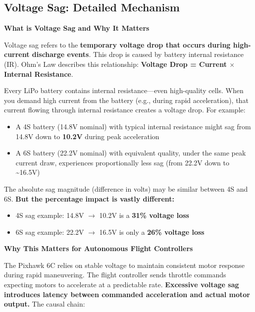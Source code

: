 \subsection{Voltage Sag: Detailed Mechanism}

\textbf{What is Voltage Sag and Why It Matters}

Voltage sag refers to the \textbf{temporary voltage drop that occurs during high-current discharge events}. This drop is caused by battery internal resistance (IR). Ohm's Law describes this relationship: \textbf{Voltage Drop = Current \(\times\) Internal Resistance}.\cite{bershadsky2016propulsion}

Every LiPo battery contains internal resistance---even high-quality cells. When you demand high current from the battery (e.g., during rapid acceleration), that current flowing through internal resistance creates a voltage drop.\cite{bershadsky2016propulsion} For example:

\begin{itemize}
    \item A 4S battery (14.8V nominal) with typical internal resistance might sag from 14.8V down to \textbf{10.2V} during peak acceleration
    \item A 6S battery (22.2V nominal) with equivalent quality, under the same peak current draw, experiences proportionally less sag (from 22.2V down to \textasciitilde16.5V)\cite{bershadsky2016propulsion}
\end{itemize}

The absolute sag magnitude (difference in volts) may be similar between 4S and 6S. \textbf{But the percentage impact is vastly different:}

\begin{itemize}
    \item 4S sag example: 14.8V \(\to\) 10.2V is a \textbf{31\% voltage loss}
    \item 6S sag example: 22.2V \(\to\) 16.5V is only a \textbf{26\% voltage loss}
\end{itemize}

\textbf{Why This Matters for Autonomous Flight Controllers}

The Pixhawk 6C relies on stable voltage to maintain consistent motor response during rapid maneuvering. The flight controller sends throttle commands expecting motors to accelerate at a predictable rate. \textbf{Excessive voltage sag introduces latency between commanded acceleration and actual motor output.} The causal chain:

